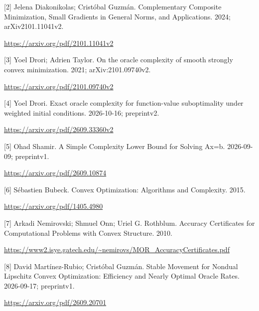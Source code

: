 \documentclass[10pt,a4paper]{article}
\begin{document}
[2] Jelena Diakonikolas; Cristóbal Guzmán. Complementary Composite Minimization, Small Gradients in General Norms, and Applications. 2024; arXiv2101.11041v2.

\url{https://arxiv.org/pdf/2101.11041v2}

[3] Yoel Drori; Adrien Taylor. On the oracle complexity of smooth strongly convex minimization. 2021; arXiv:2101.09740v2.

\url{https://arxiv.org/pdf/2101.09740v2}

[4] Yoel Drori. Exact oracle complexity for function-value suboptimality under weighted initial conditions. 2026-10-16; preprintv2.

\url{https://arxiv.org/pdf/2609.33360v2}

[5] Ohad Shamir. A Simple Complexity Lower Bound for Solving Ax=b. 2026-09-09; preprintv1.

\url{https://arxiv.org/pdf/2609.10874}

[6] Sébastien Bubeck. Convex Optimization: Algorithms and Complexity. 2015.

\url{https://arxiv.org/pdf/1405.4980}

[7] Arkadi Nemirovski; Shmuel Onn; Uriel G. Rothblum. Accuracy Certificates for Computational Problems with Convex Structure. 2010.

\url{https://www2.isye.gatech.edu/~nemirovs/MOR_AccuracyCertificates.pdf}

[8] David Martínez-Rubio; Cristóbal Guzmán. Stable Movement for Nondual Lipschitz Convex Optimization: Efficiency and Nearly Optimal Oracle Rates. 2026-09-17; preprintv1.

\url{https://arxiv.org/pdf/2609.20701}
\end{document}
